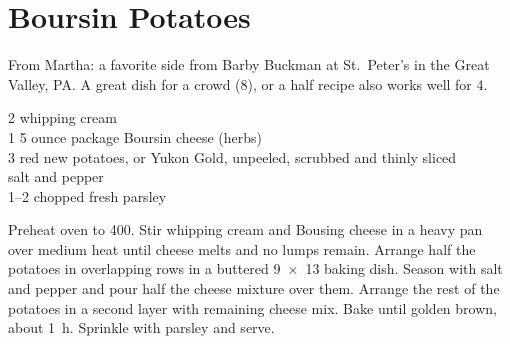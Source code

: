 \section{Boursin Potatoes}

\begin{open}
    From Martha: a favorite side from Barby Buckman at St.~Peter's in the Great
    Valley, PA. A great dish for a crowd (8), or a half recipe also works well
    for 4.
\end{open}
\begin{ingredients}
    \SI{2}{\cup} whipping cream\\
    1 \SI{5}{\ounce} ounce package Boursin cheese (herbs)\\
    \SI{3}{\pound} red new potatoes, or Yukon Gold, unpeeled, scrubbed and
    thinly sliced\\
    salt and pepper\\
    \SIrange{1}{2}{\tblspoon} chopped fresh parsley
\end{ingredients}
Preheat oven to \SI{400}{\degreeF}. Stir whipping cream and Bousing cheese in a
heavy pan over medium heat until cheese melts and no lumps remain. Arrange half
the potatoes in overlapping rows in a buttered \SI{9x13}{\inch} baking dish.
Season with salt and pepper and pour half the cheese mixture over them. Arrange
the rest of the potatoes in a second layer with remaining cheese mix. Bake until
golden brown, about \SI{1}{\hour}. Sprinkle with parsley and serve.
